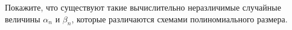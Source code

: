 Покажите, что существуют такие вычислительно неразличимые случайные величины $\alpha_n$ и $\beta_n$,
которые различаются схемами полиномиального размера.
